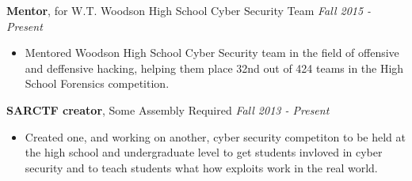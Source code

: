 \documentclass[9pt]{article}
\newenvironment{changemargin}[2]{%
  \begin{list}{}{%
    \setlength{\topsep}{0pt}%
    \setlength{\leftmargin}{#1}%
    \setlength{\rightmargin}{#2}%
    \setlength{\listparindent}{\parindent}%
    \setlength{\itemindent}{\parindent}%
    \setlength{\parsep}{\parskip}%
  }%
  \item[]}{\end{list}
}
\newcommand{\lineover}{
	\begin{changemargin}{-0.05in}{-0.05in}
		\vspace*{-8pt}
		\hrulefill \\
		\vspace*{-2pt}
	\end{changemargin}
}
\newcommand{\header}[1]{
	\begin{changemargin}{-0.5in}{-0.5in}
		\scshape{#1}\\
  	\lineover
	\end{changemargin}
}
\newenvironment{body} {
	\vspace*{-10pt}
	\begin{changemargin}{-0.25in}{-0.5in}
  }	
	{\end{changemargin}
}
\begin{document}
\begin{body}
	\textbf{Mentor}, for W.T. Woodson High School Cyber Security Team \hfill{} \emph{Fall 2015 - Present}\\
	\vspace*{-4pt}
	\begin{itemize} \itemsep -0pt
        \item[] Mentored Woodson High School Cyber Security team in the field of offensive and deffensive hacking, helping them place 32nd out of 424 teams in the High School Forensics competition.
	\end{itemize}
	\smallskip
		
	\textbf{SARCTF creator}, Some Assembly Required \hfill{} \emph{Fall 2013 - Present}\\
	\vspace*{-4pt}
	\begin{itemize} \itemsep -0pt
        \item[] Created one, and working on another, cyber security competiton to be held at the high school and undergraduate level to get students invloved in cyber security and to teach students what how exploits work in the real world.
	\end{itemize}
	\smallskip
\end{body}

\smallskip

%
%
%
\end{document}
